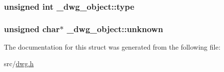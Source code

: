 \hypertarget{struct__dwg__object_a6ac13d29d4d6e3490c2fa8ede86e4e24}{
\subsubsection[{type}]{\setlength{\rightskip}{0pt plus 5cm}unsigned int {\bf \-\_\-dwg\-\_\-object\-::type}}}\label{struct__dwg__object_a6ac13d29d4d6e3490c2fa8ede86e4e24}
\hypertarget{struct__dwg__object_a7e59deccc06272bde2e3c9c3d1431c1f}{
\subsubsection[{unknown}]{\setlength{\rightskip}{0pt plus 5cm}unsigned char$\ast$ {\bf \-\_\-dwg\-\_\-object\-::unknown}}}\label{struct__dwg__object_a7e59deccc06272bde2e3c9c3d1431c1f}


\-The documentation for this struct was generated from the following file\-:\begin{DoxyCompactItemize}
\item 
src/\hyperlink{dwg_8h}{dwg.\-h}\end{DoxyCompactItemize}

